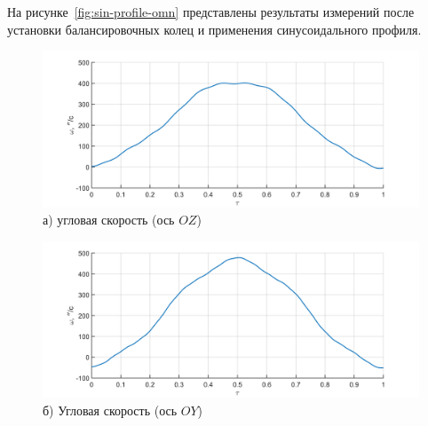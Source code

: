 На рисунке~\cref{fig:sin-profile-omn} представлены результаты измерений после установки балансировочных колец и применения синусоидального профиля.
\begin{figure}[h!]
	\begin{minipage}[b]{0.49\linewidth}\centering
		\includegraphics[width=\linewidth]{matlab/img/oz-gyro-sin-vel} \\ а) угловая скорость (ось $OZ$)
	\end{minipage}
	\hfill
	\begin{minipage}[b]{0.49\linewidth}\centering
		\includegraphics[width=\linewidth]{matlab/img/oy-gyro-sin-vel} \\ б) Угловая скорость (ось $OY$)
	\end{minipage}
	
	\vspace{0.5em} %
	

\end{figure}

